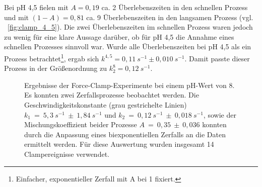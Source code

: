 Bei pH 4,5 fielen mit $A = 0,19$ ca. 2 Überlebenszeiten in den schnellen Prozess und mit $(1-A) = 0,81$ ca. 9 Überlebenszeiten in den langsamen Prozess (vgl. \abb~\ref{fig:clamp_4_5}). Die zwei Überlebenszeiten im schnellen Prozess waren jedoch zu wenig für eine klare Aussage darüber, ob für pH 4,5 die Annahme eines schnellen Prozesses sinnvoll war. Wurde alle Überlebenszeiten bei pH 4,5 als ein Prozess betrachtet\footnote{Einfacher, exponentieller Zerfall mit A bei 1 fixiert.}, ergab sich $k^{4,5} = 0,11~s^{-1} \pm 0,010~s^{-1}$. Damit passte dieser Prozess in der Größenordnung zu $k_2^8 = 0,12~s^{-1}$. 

\begin{figure}[H]
	\centering
	\caption[Ergebnisse der Force-Clamp-Experimente bei einem pH-Wert von 8]{Ergebnisse der Force-Clamp-Experimente bei einem pH-Wert von 8. Es konnten zwei Zerfallsprozesse beobachtet werden. Die Geschwindigkeitskonstante (grau gestrichelte Linien) $k_1~=~5,3~s^{-1}~\pm~1,84~s^{-1}$ und $k_2~=~0,12~s^{-1}~\pm~0,018~s^{-1}$, sowie der Mischungskoeffizient beider Prozesse $A~=~0,35~\pm~0,036$ konnten durch die Anpassung eines biexponentiellen Zerfalls an die Daten ermittelt werden. Für diese Auswertung wurden insgesamt 14 Clampereignisse verwendet.}
	\label{fig:clamp_8}
\end{figure}


